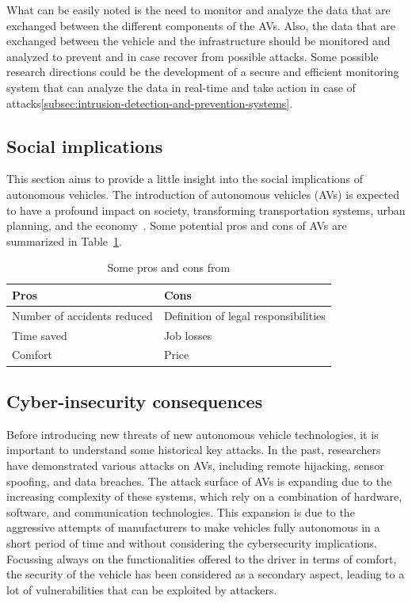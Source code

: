 What can be easily noted is the need to monitor and analyze the data that are exchanged between the different components of the AVs.
Also, the data that are exchanged between the vehicle and the infrastructure should be monitored and analyzed to prevent and in case recover from possible attacks.
Some possible research directions could be the development of a secure and efficient monitoring system that can analyze the data in real-time and take action in case of attacks\ref{subsec:intrusion-detection-and-prevention-systems}.

\subsection{Social implications}\label{subsec:social-implications}

This section aims to provide a little insight into the social implications of autonomous vehicles.
The introduction of autonomous vehicles (AVs) is expected to have a profound impact on society\cite{thomas2020perception},
transforming transportation systems\cite{intelligent_transportation_2023}, urban planning\cite{impact_autonomous_vehicles_2018},
and the economy~\cite{economic_aspects_2020}.
Some potential pros and cons of AVs are summarized in Table~\ref{tab:table}.

\begin{table}[ht]
    \centering
    \begin{tabular}{|l|l|}
        \hline
        \textbf{Pros} & \textbf{Cons} \\ \hline
        Number of accidents reduced & Definition of legal responsibilities \\ \hline
        Time saved & Job losses \\ \hline
        Comfort & Price \\ \hline
    \end{tabular}
    \caption{Some pros and cons from \cite{ahangar2021survey} }\label{tab:table}
\end{table}


\subsection{Cyber-insecurity consequences}\label{subsec:cyber-insecurity}

Before introducing new threats of new autonomous vehicle technologies, it is important to understand some historical key attacks.
In the past, researchers have demonstrated various attacks on AVs, including remote hijacking, sensor spoofing, and data breaches.
The attack surface of AVs is expanding due to the increasing complexity of these systems, which rely on a combination of hardware, software, and communication technologies\cite{cybersec}.
This expansion is due to the aggressive attempts of manufacturers to
make vehicles fully autonomous in a short period of time and without considering the cybersecurity implications.
Focussing always on the functionalities offered to the driver in terms of comfort, the security of the vehicle has been considered as a secondary aspect, leading to a lot of vulnerabilities that can be exploited by attackers.

